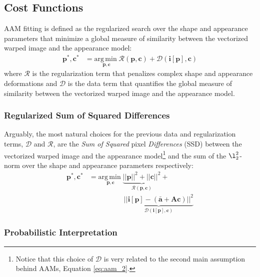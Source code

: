 \subsection{Cost Functions}
\label{sec:cost}

AAM fitting is defined as the regularized search over the shape and appearance parameters that minimize a global measure of similarity between the vectorized warped image and the appearance model:
\begin{equation}
    \begin{aligned}
        \mathbf{p}^*, \mathbf{c}^* & = \underset{\mathbf{p}, \mathbf{c}} {\mathrm{arg\, min\;}} \mathcal{R} (\mathbf{p}, \mathbf{c}) + \mathcal{D} (\mathbf{i}[\mathbf{p}], \mathbf{c}) 
        \end{aligned}
    \label{eq:aam_fitting}
\end{equation}
where $\mathcal{R}$ is the regularization term that penalizes complex shape and appearance deformations and $\mathcal{D}$ is the data term that
quantifies the global measure of similarity between the vectorized warped image and the appearance model.

\subsubsection{Regularized Sum of Squared Differences}
\label{sec:rssd}

Arguably, the most natural choices for the previous data and regularization terms, $\mathcal{D}$ and $\mathcal{R}$, are the \emph{Sum of Squared} pixel \emph{Differences} (SSD) between the vectorized warped image and the appearance model\footnote{Notice that this choice of $\mathcal{D}$ is very related to the second main assumption behind AAMs, Equation \ref{eq:aam_2}.} and the sum of the $\l_2^2$-norm over the shape and appearance parameters respectively:
\begin{equation}
    \begin{aligned}
        \mathbf{p}^*, \mathbf{c}^* & = \underset{\mathbf{p}, \mathbf{c}} {\mathrm{arg\, min\;}} \underbrace{||\mathbf{p}||^2 + ||\mathbf{c}||^2}_{\mathcal{R} (\mathbf{p}, \mathbf{c})} +
        \\
        & \qquad \qquad \quad \underbrace{|| \mathbf{i}[\mathbf{p}] - (\mathbf{\bar{a}} + \mathbf{A} \mathbf{c}) ||^2}_{\mathcal{D} (\mathbf{i}[\mathbf{p}], \mathbf{c})}
    \end{aligned}
    \label{eq:rssd}
\end{equation}
\subsubsection*{Probabilistic Interpretation}
\label{sec:rssd_pi}

